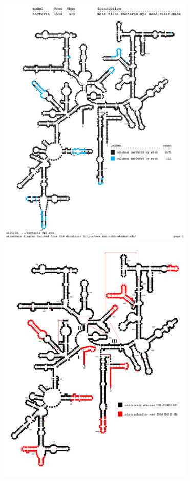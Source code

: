 \begin{figure}
  \begin{center}
    \includegraphics[width=3.7in]{Figures/bacteria-0p1-maskcol}
    \includegraphics[width=3.7in]{Figures/lane-ecoli}
  \end{center}
  \caption[Similarity of an  automatically
    constructed mask with David Lane's SSU alignment mask.]{
}
\end{figure}
